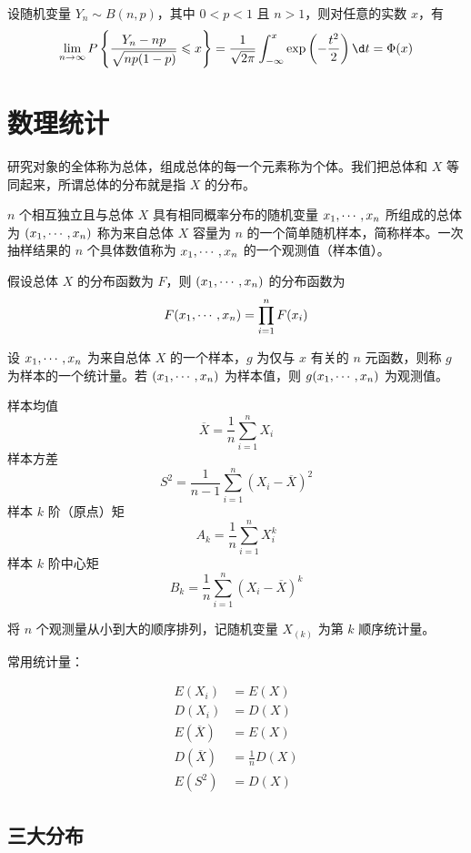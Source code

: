 \begin{theorem}
	设随机变量 $Y_n \sim B(n, p)$，其中 $0 < p < 1$ 且 $n > 1$，则对任意的实数 $x$，有
	\[ \lim_{n \to \infty} P\left\{ \frac{Y_n - np}{\sqrt{np(1 - p)}} \leqslant x \right\} = \frac{1}{\sqrt{2 \pi}} \int_{-\infty}^x \exp\left(-\frac{t^2}{2}\right) \d t = \Phi(x)  \]
\end{theorem}

\section{数理统计}

研究对象的全体称为总体，组成总体的每一个元素称为个体。我们把总体和 $X$ 等同起来，所谓总体的分布就是指 $X$ 的分布。

$n$ 个相互独立且与总体 $X$ 具有相同概率分布的随机变量 $x_1,\cdots,x_n$ 所组成的总体为 $(x_1,\cdots,x_n)$ 称为来自总体 $X$ 容量为 $n$ 的一个简单随机样本，简称样本。一次抽样结果的 $n$ 个具体数值称为 $x_1,\cdots,x_n$ 的一个观测值（样本值）。

假设总体 $X$ 的分布函数为 $F$，则 $(x_1,\cdots,x_n)$ 的分布函数为
\[ F(x_1,\cdots,x_n) = \prod_{i=1}^n F(x_i) \]

设 $x_1,\cdots,x_n$ 为来自总体 $X$ 的一个样本，$g$ 为仅与 $x$ 有关的 $n$ 元函数，则称 $g$ 为样本的一个统计量。若 $(x_1,\cdots,x_n)$ 为样本值，则 $g(x_1,\cdots,x_n)$ 为观测值。

样本均值
\[ \overline{X} = \frac{1}{n} \sum_{i=1}^n X_i \]
样本方差
\[ S^2 = \frac{1}{n-1} \sum_{i=1}^n (X_i - \overline{X})^2 \]
样本 $k$ 阶（原点）矩
\[ A_k = \frac{1}{n} \sum_{i=1}^n X_i^k \]
样本 $k$ 阶中心矩
\[ B_k = \frac{1}{n} \sum_{i=1}^n (X_i - \overline{X})^k \]

将 $n$ 个观测量从小到大的顺序排列，记随机变量 $X_{(k)}$ 为第 $k$ 顺序统计量。

常用统计量：

\[
	\begin{aligned}
		E(X_i)          & = E(X)             \\
		D(X_i)          & = D(X)             \\
		E(\overline{X}) & = E(X)             \\
		D(\overline{X}) & = \frac{1}{n} D(X) \\
		E(S^2)          & = D(X)
	\end{aligned}
\]

\subsection{三大分布}

